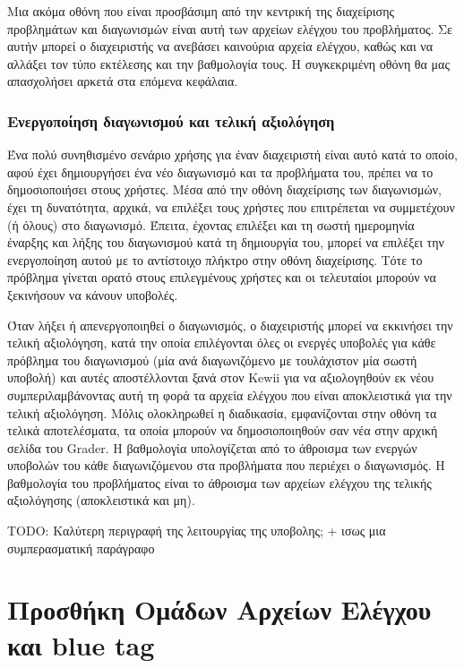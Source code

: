 \documentclass[diploma]{softlab-thesis}
\begin{document}
Μια ακόμα οθόνη που είναι προσβάσιμη από την κεντρική της διαχείρισης προβλημάτων
και διαγωνισμών είναι αυτή των αρχείων ελέγχου του προβλήματος. Σε αυτήν μπορεί
ο διαχειριστής να ανεβάσει καινούρια αρχεία ελέγχου, καθώς και να αλλάξει τον τύπο
εκτέλεσης και την βαθμολογία τους. Η συγκεκριμένη οθόνη θα μας απασχολήσει αρκετά
στα επόμενα κεφάλαια.

\subsection{Ενεργοποίηση διαγωνισμού και τελική αξιολόγηση}

Ένα πολύ συνηθισμένο σενάριο χρήσης για έναν διαχειριστή είναι αυτό κατά το
οποίο, αφού έχει δημιουργήσει ένα νέο διαγωνισμό και τα προβλήματα του, πρέπει
να το δημοσιοποιήσει στους χρήστες. Μέσα από την οθόνη διαχείρισης των
διαγωνισμών, έχει τη δυνατότητα, αρχικά, να επιλέξει τους χρήστες που
επιτρέπεται να συμμετέχουν (ή όλους) στο διαγωνισμό. Έπειτα, έχοντας επιλέξει
και τη σωστή ημερομηνία έναρξης και λήξης του διαγωνισμού κατά τη δημιουργία
του, μπορεί να επιλέξει την ενεργοποίηση αυτού με το αντίστοιχο πλήκτρο στην
οθόνη διαχείρισης. Τότε το πρόβλημα γίνεται ορατό στους επιλεγμένους χρήστες
και οι τελευταίοι μπορούν να ξεκινήσουν να κάνουν υποβολές.

\bigskip

Όταν λήξει ή απενεργοποιηθεί ο διαγωνισμός, ο διαχειριστής μπορεί να εκκινήσει
την τελική αξιολόγηση, κατά την οποία επιλέγονται όλες οι ενεργές υποβολές για
κάθε πρόβλημα του διαγωνισμού (μία ανά διαγωνιζόμενο με τουλάχιστον μία σωστή
υποβολή) και αυτές αποστέλλονται ξανά στον Kewii για να αξιολογηθούν εκ νέου
συμπεριλαμβάνοντας αυτή τη φορά τα αρχεία ελέγχου που είναι αποκλειστικά για
την τελική αξιολόγηση. Μόλις ολοκληρωθεί η διαδικασία, εμφανίζονται στην οθόνη
τα τελικά αποτελέσματα, τα οποία μπορούν να δημοσιοποιηθούν σαν νέα στην αρχική
σελίδα του Grader. Η βαθμολογία υπολογίζεται από το άθροισμα των ενεργών
υποβολών του κάθε διαγωνιζόμενου στα προβλήματα που περιέχει ο διαγωνισμός. Η
βαθμολογία του προβλήματος είναι το άθροισμα των αρχείων ελέγχου της τελικής
αξιολόγησης (αποκλειστικά και μη).

TODO: Καλύτερη περιγραφή της λειτουργίας της υποβολης; + ισως μια συμπερασματική παράγραφο

\chapter{Προσθήκη Ομάδων Αρχείων Ελέγχου και blue tag}
\end{document}
